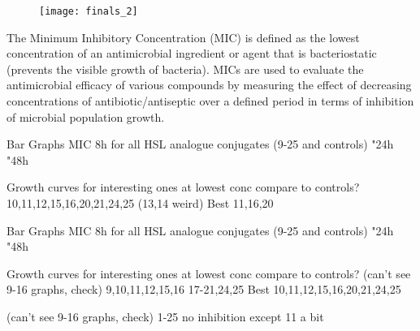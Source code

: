 \begin{figure}[H]
	\begin{center}
		\texttt{[image: finals\_2]}
		\caption{
 		\label{fgr:finals_2}}
	\end{center}
\end{figure}


The Minimum Inhibitory Concentration (MIC) is defined as the lowest concentration of an antimicrobial ingredient or agent that is bacteriostatic (prevents the visible growth of bacteria). MICs are used to evaluate the antimicrobial efficacy of various compounds by measuring the effect of decreasing concentrations of antibiotic/antiseptic over a defined period in terms of inhibition of microbial population growth.  


Bar Graphs
MIC 8h for all HSL analogue conjugates (9-25 and controls)
"24h
"48h

Growth curves for interesting ones at lowest conc compare to controls?
10,11,12,15,16,20,21,24,25 (13,14 weird)
Best 11,16,20


Bar Graphs
MIC 8h for all HSL analogue conjugates (9-25 and controls)
"24h
"48h

Growth curves for interesting ones at lowest conc compare to controls?
(can't see 9-16 graphs, check)
9,10,11,12,15,16
17-21,24,25
Best 10,11,12,15,16,20,21,24,25

(can't see 9-16 graphs, check)
1-25 no inhibition
except 11 a bit



